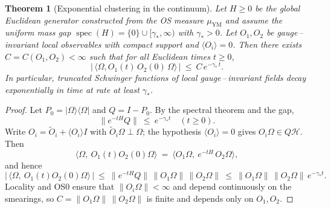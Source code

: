 \documentclass[11pt]{amsart}
\theoremstyle{plain}
\newtheorem{theorem}{Theorem}[section]
\theoremstyle{definition}
\theoremstyle{remark}
\begin{document}
\begin{theorem}[Exponential clustering in the continuum]\label{thm:cont-exp-cluster}
Let $H\ge 0$ be the global Euclidean generator constructed from the OS measure $\mu_{\mathrm{YM}}$ and assume the uniform mass gap $\operatorname{spec}(H)=\{0\}\cup[\gamma_*,\infty)$ with $\gamma_*>0$. Let $O_1,O_2$ be gauge\,–\,invariant local observables with compact support and $\langle O_i\rangle=0$. Then there exists $C=C(O_1,O_2)<\infty$ such that for all Euclidean times $t\ge 0$,
\[
  \big|\,\langle\Omega, O_1(t)\,O_2(0)\,\Omega\rangle\,\big|\ \le\ C\,e^{-\gamma_*\,t}.
\]
In particular, truncated Schwinger functions of local gauge\,–\,invariant fields decay exponentially in time at rate at least $\gamma_*$.
\end{theorem}
\begin{proof}
Let $P_0=\vert\Omega\rangle\langle\Omega\vert$ and $Q=I-P_0$. By the spectral theorem and the gap,
\[
  \| e^{-tH} Q \|\ \le\ e^{-\gamma_* t}\quad (t\ge 0).
\]
Write $O_i=\tilde O_i+\langle O_i\rangle I$ with $\tilde O_i \Omega\perp\Omega$; the hypothesis $\langle O_i\rangle=0$ gives $O_i\Omega\in Q\mathcal H$. Then
\[
  \langle\Omega,\ O_1(t) O_2(0)\Omega\rangle\ =\ \langle O_1\Omega,\ e^{-tH}\,O_2\Omega\rangle,
\]
and hence
\[
  \big|\,\langle\Omega,\ O_1(t) O_2(0)\Omega\rangle\,\big|\ \le\ \| e^{-tH} Q \|\,\|O_1\Omega\|\,\|O_2\Omega\|\ \le\ \|O_1\Omega\|\,\|O_2\Omega\|\,e^{-\gamma_* t}.
\]
Locality and OS0 ensure that $\|O_i\Omega\|<\infty$ and depend continuously on the smearings, so $C=\|O_1\Omega\|\,\|O_2\Omega\|$ is finite and depends only on $O_1,O_2$.
\end{proof}
\end{document}
